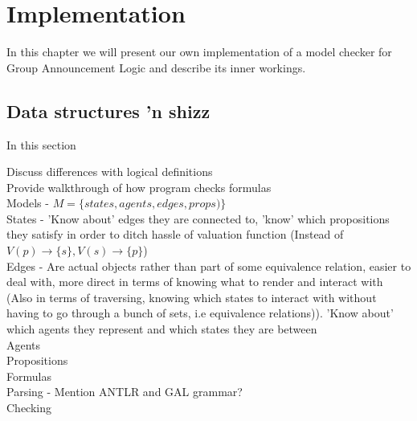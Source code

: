 \section{Implementation}\label{sec:impl}

In this chapter we will present our own implementation of a model checker for Group Announcement Logic and describe its inner workings.

\subsection{Data structures 'n shizz}

In this section

Discuss differences with logical definitions\\
Provide walkthrough of how program checks formulas\\


Models - $M = \{states, agents, edges, props)\}$\\

States - 'Know about' edges they are connected to, 'know' which propositions they satisfy in order to ditch hassle of valuation function (Instead of $V(p) \rightarrow \{s\}, V(s) \rightarrow \{p\}$)\\

Edges - Are actual objects rather than part of some equivalence relation, easier to deal with, more direct in terms of knowing what to render and interact with (Also in terms of traversing, knowing which states to interact with without having to go through a bunch of sets, i.e equivalence relations)). 'Know about' which agents they represent and which states they are between\\

Agents\\
Propositions\\
Formulas\\
Parsing - Mention ANTLR and GAL grammar?\\
Checking\\